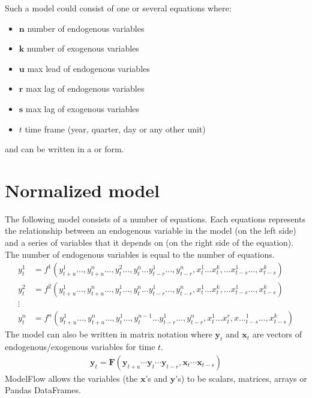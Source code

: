 \documentclass[letterpaper,10pt,english]{jupyterBook}
\begin{document}
\sphinxAtStartPar
Such a model could consist of one or several equations where:
\begin{itemize}
\item {} 
\sphinxAtStartPar
\(\mathbf{n}\) number of endogenous variables

\item {} 
\sphinxAtStartPar
\(\mathbf{k}\) number of exogenous variables

\item {} 
\sphinxAtStartPar
\(\mathbf{u}\) max lead of endogenous variables

\item {} 
\sphinxAtStartPar
\(\mathbf{r}\) max lag of endogenous variables

\item {} 
\sphinxAtStartPar
\(\mathbf{s}\) max lag of exogenous variables

\item {} 
\sphinxAtStartPar
\(t\) time frame (year, quarter, day or any other unit)

\end{itemize}

\sphinxAtStartPar
and can be written in a  or  form.


\section{Normalized model}
\label{\detokenize{content/notebooks/intro/model and solution:normalized-model}}
\sphinxAtStartPar
The following model consists of a number of equations. Each equations represents the relationship between an endogenous variable in the model (on the left side) and a series of variables that it depends on (on the right side of the equation). The number of endogenous variables is equal to the number of equations.
\begin{align*}
y_t^1  &=  f^1(y_{t+u}^1...,y_{t+u}^n...,y_t^2...,y_{t}^n...y_{t-r}^1...,y_{t-r}^n,x_t^1...x_{t}^k,...x_{t-s}^1...,x_{t-s}^k) \\
y_t^2  &=  f^2(y_{t+u}^1...,y_{t+u}^n...,y_t^1...,y_{t}^n...y_{t-r}^1...,y_{t-r}^n,x_t^1...x_{t}^k,...x_{t-s}^1...,x_{t-s}^k) \\
\vdots \\
y_t^n  &=  f^n(y_{t+u}^1...,y_{t+u}^n...,y_t^1...,y_{t}^{n-1}...y_{t-r}^1...,y_{t-r}^n,x_t^1...x_{t}^r,x..._{t-s}^1...,x_{t-s}^k)
\end{align*}
\sphinxAtStartPar
The model can also be written in matrix notation where  \(\mathbf{y}_t\) and \(\mathbf{x}_t\) are vectors of endogenous/exogenous variables for time \(t\).
\begin{equation*}
\begin{split}
\mathbf{y}_t = \mathbf{F}(\mathbf{y}_{t+u} \cdots \mathbf{y}_t \cdots \mathbf{y}_{t-r},\mathbf{x}_t \cdots \mathbf{x}_{t-s})
\end{split}
\end{equation*}
\sphinxAtStartPar
ModelFlow allows the variables (the  \(𝐱\)’s and \(𝐲\)’s) to be scalars, matrices, arrays or Pandas DataFrames.
\end{document}
